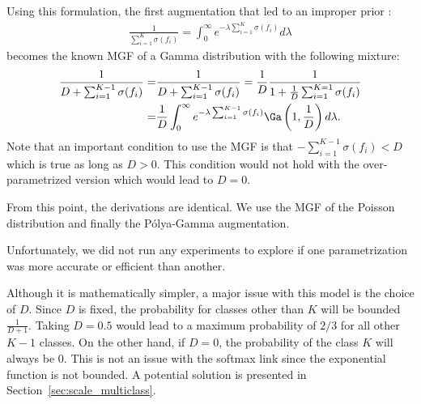Using this formulation, the first augmentation that led to an improper prior :
\begin{align*}
    \frac{1}{ \sum_{i=1}^{K} \sigma(f_i)} = \int_0^\infty e^{-\lambda  \sum_{i=1}^{K} \sigma(f_i)}d\lambda
\end{align*}
becomes the known \ac{MGF} of a Gamma distribution with the following mixture:
\begin{align*}
    \frac{1}{D + \sum_{i=1}^{K-1} \sigma(f_i)} =& \frac{1}{D + \sum_{i=1}^{K-1} \sigma(f_i)} = \frac{1}{D}\frac{1}{1+\frac{1}{D}\sum_{i=1}^{K=1}\sigma(f_i)}\\
    =& \frac{1}{D}\int_0^\infty e^{-\lambda \sum_{i=1}^{K-1} \sigma(f_i)}\Ga \left(1, \frac{1}{D}\right)d\lambda.
\end{align*}
Note that an important condition to use the \ac{MGF} is that $-\sum_{i=1}^{K-1} \sigma(f_i) < D$ which is true as long as $D > 0$.
This condition would not hold with the over-parametrized version which would lead to $D=0$.

From this point, the derivations are identical.
We use the \ac{MGF} of the Poisson distribution and finally the P\'olya-Gamma augmentation.

Unfortunately, we did not run any experiments to explore if one parametrization was more accurate or efficient than another.

Although it is mathematically simpler, a major issue with this model is the choice of $D$.
Since $D$ is fixed, the probability for classes other than $K$ will be bounded $\frac{1}{D + 1}$.
Taking $D=0.5$ would lead to a maximum probability of $2/3$ for all other $K-1$ classes.
On the other hand, if $D=0$, the probability of the class $K$ will always be $0$.
This is not an issue with the softmax link since the exponential function is not bounded.
A potential solution is presented in Section~\ref{sec:scale_multiclass}.

